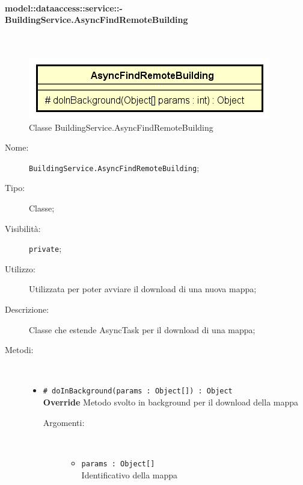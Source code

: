\documentclass[../DefinizioneDiProdotto.tex]{subfiles}
\begin{document}
\paragraph{model::dataaccess::service::-\\BuildingService.AsyncFindRemoteBuilding}
\
\begin{figure}[H]
	\centering
	\includegraphics[width=\maxwidth]{img/BuildingService-AsyncFindRemoteBuilding.png}
	\caption{Classe BuildingService.AsyncFindRemoteBuilding}\label{fig:model::dataaccess::service::BuildingService.AsyncFindRemoteBuilding} 
\end{figure}
\begin{description}
	\item[Nome:] \texttt{BuildingService.AsyncFindRemoteBuilding};
	\item[Tipo:] Classe;
	\item[Visibilità:] \texttt{private};
	\item[Utilizzo:] Utilizzata per poter avviare il download di una nuova mappa;
	\item[Descrizione:] Classe che estende AsyncTask per il download di una mappa;
	\item[Metodi:] \
	\begin{itemize}
		\item \texttt{\# doInBackground(params : Object[]) : Object}\\
		\textbf{Override} Metodo svolto in background per il download della mappa
		\begin{description}
			\item[Argomenti:] \
			\begin{itemize}
				\item \texttt{params : Object[]}\\
				Identificativo della mappa\end{itemize}
		\end{description}
	\end{itemize}
\end{description}
\end{document}
